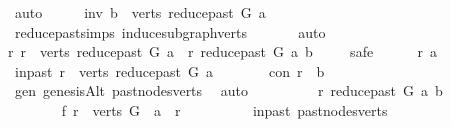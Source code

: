 \begin{isabellebody}
\ auto\isanewline
\ \ \isamarkupfalse%
\ \isamarkupfalse%
\ inv{\isacharcolon}{\kern0pt}\ {\isachardoublequoteopen}b\ {\isasymin}\ verts\ {\isacharparenleft}{\kern0pt}reduce{\isacharunderscore}{\kern0pt}past\ G\ a{\isacharparenright}{\kern0pt}{\isachardoublequoteclose}\ \isamarkupfalse%
\ reduce{\isacharunderscore}{\kern0pt}past{\isachardot}{\kern0pt}simps\ induce{\isacharunderscore}{\kern0pt}subgraph{\isacharunderscore}{\kern0pt}verts\ \isanewline
\ \ \ \ \isamarkupfalse%
\ auto\isanewline
\ \ \isamarkupfalse%
{\isachardoublequoteopen}{\isasymforall}r{\isachardot}{\kern0pt}\ r\ {\isasymin}\ verts\ {\isacharparenleft}{\kern0pt}reduce{\isacharunderscore}{\kern0pt}past\ G\ a{\isacharparenright}{\kern0pt}\ {\isasymlongrightarrow}\ r\ {\isasymrightarrow}\isactrlsup {\isacharasterisk}{\kern0pt}\isactrlbsub reduce{\isacharunderscore}{\kern0pt}past\ G\ a\isactrlesub \ b{\isachardoublequoteclose}\ \isanewline
\ \ \isamarkupfalse%
\ safe\isanewline
\ \ \ \ \isamarkupfalse%
\ r\ a\isanewline
\ \ \ \ \isamarkupfalse%
\ in{\isacharunderscore}{\kern0pt}past{\isacharcolon}{\kern0pt}\ {\isachardoublequoteopen}r\ {\isasymin}\ verts\ {\isacharparenleft}{\kern0pt}reduce{\isacharunderscore}{\kern0pt}past\ G\ a{\isacharparenright}{\kern0pt}{\isachardoublequoteclose}\isanewline
\ \ \ \ \isamarkupfalse%
\ \isamarkupfalse%
\ con{\isacharcolon}{\kern0pt}\ {\isachardoublequoteopen}r\ {\isasymrightarrow}\isactrlsup {\isacharasterisk}{\kern0pt}\ b{\isachardoublequoteclose}\ \isamarkupfalse%
\ gen\ genesisAlt\ past{\isacharunderscore}{\kern0pt}nodes{\isacharunderscore}{\kern0pt}verts\ \isamarkupfalse%
\ auto\ \ \isanewline
\ \ \ \ \isamarkupfalse%
\ \isamarkupfalse%
\ {\isachardoublequoteopen}r\ {\isasymrightarrow}\isactrlsup {\isacharasterisk}{\kern0pt}\isactrlbsub reduce{\isacharunderscore}{\kern0pt}past\ G\ a\isactrlesub \ b{\isachardoublequoteclose}\isanewline
\ \ \ \ \isamarkupfalse%
\ {\isacharminus}{\kern0pt}\isanewline
\ \ \ \ \ \ \isamarkupfalse%
\ f{}{\isacharcolon}{\kern0pt}\ {\isachardoublequoteopen}r\ {\isasymin}\ verts\ G\ {\isasymand}\ a\ {\isasymrightarrow}\isactrlsup {\isacharplus}{\kern0pt}\ r{\isachardoublequoteclose}\isanewline
\ \ \ \ \ \ \ \ \isamarkupfalse%
\ in{\isacharunderscore}{\kern0pt}past\ past{\isacharunderscore}{\kern0pt}nodes{\isacharunderscore}{\kern0pt}verts\ \isamarkupfalse%

\end{isabellebody}
